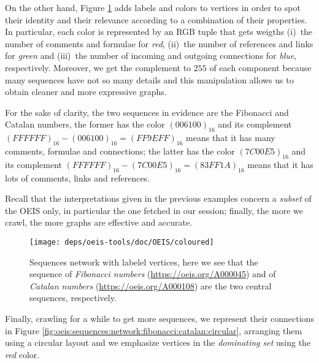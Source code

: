 \begin{example}
On the other hand, Figure
\ref{fig:oeis:sequences:network:fibonacci:catalan:labeled} adds labels and
colors to vertices in order to spot their identity and their relevance
according to a combination of their properties. In particular, each color is
represented by an RGB tuple that gets weigths (i)~the number of comments and
formulae for \textit{red}, (ii)~the number of references and links for
\textit{green} and (iii)~the number of incoming and outgoing connections for
\textit{blue}, respectively. Moreover, we get the complement to $255$ of each
component because many sequences have not so many details and this manipulation
allows us to obtain cleaner and more expressive graphs.

For the sake of clarity, the two sequences in evidence are the Fibonacci and
Catalan numbers, the former has the color $(006100)_{16}$ and its complement
$(FFFFFF)_{16}-(006100)_{16}=(FF9EFF)_{16}$ means that it has many comments,
formulae and connections; the latter has the color $(7C00E5)_{16}$ and its
complement $(FFFFFF)_{16}-(7C00E5)_{16}=(83FF1A)_{16}$ means that it has lots
of comments, links and references.
\end{example}

\begin{remark}
Recall that the interpretations given in the previous examples concern a
\textit{subset} of the OEIS only, in particular the one fetched in our session;
finally, the more we crawl, the more graphs are effective and accurate.
\end{remark}

\begin{figure}
\begin{sideways}
\texttt{[image: deps/oeis-tools/doc/OEIS/coloured]}
\caption{Sequences network with labelel vertices, here we see that the sequence
of \textit{Fibonacci numbers} (\url{https://oeis.org/A000045}) and of
\textit{Catalan numbers} (\url{https://oeis.org/A000108}) are the two central
sequences, respectively.}
\end{sideways}
\label{fig:oeis:sequences:network:fibonacci:catalan:labeled}
\end{figure}

\begin{example}
Finally, crawling for a while to get more sequences, we represent their
connections in Figure
\ref{fig:oeis:sequences:network:fibonacci:catalan:circular}, arranging them
using a circular layout and we emphasize vertices in the \textit{dominating
set} using the \textit{red} color.
\end{example}

